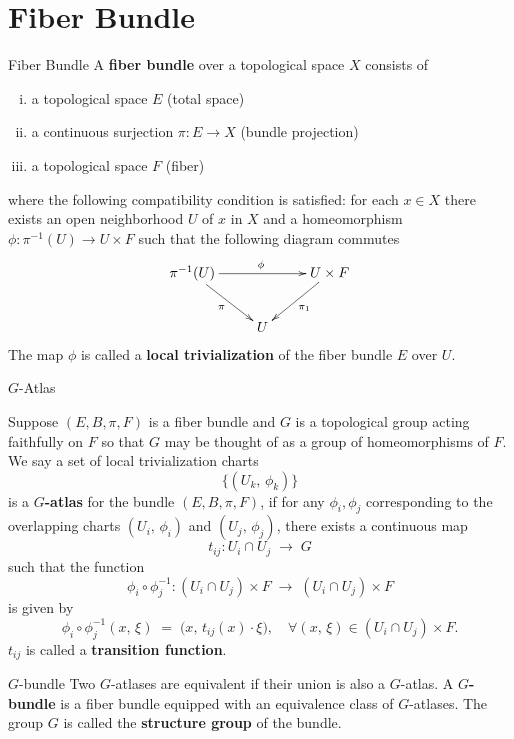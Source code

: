\documentclass{report}
\begin{document}
\section{Fiber Bundle}
\begin{definition}{Fiber Bundle}{}
	A \textbf{fiber bundle} over a topological space $X$ consists of
	\begin{enumerate}[(i)]
		\item a topological space $E$ (total space)
		\item a continuous surjection $\pi:E\to X$ (bundle projection)
		\item a topological space $F$ (fiber)
	\end{enumerate}
	where the following compatibility condition is satisfied: for each $x\in X$ there exists an open neighborhood $U$ of $x$ in $X$ and a homeomorphism $\phi:\pi^{-1}(U)\to U\times F$ such that
	the following diagram commutes
	\[\xymatrix{
			\pi^{-1}(U)\ar[rd]_{\pi}\ar[rr]^{\phi}  & &U\times F\ar[ld]^{\pi_1}\\
			&U&
		}\]
	The map $\phi$ is called a \textbf{local trivialization} of the fiber bundle $E$ over $U$.
\end{definition}

\begin{definition}{$G$-Atlas}{}

Suppose $(E, B, \pi, F)$ is a fiber bundle and $G$ is a topological group acting faithfully on $F$ so that $G$ may be thought of as a group of homeomorphisms of $F$. We say a set of local trivialization charts 
\[
\{(U_k,\, \phi_k)\}
\]
is a \textbf{$G$-atlas} for the bundle $(E, B, \pi, F)$, if for any $\phi_i, \phi_j$ corresponding to the overlapping charts $(U_i,\, \phi_i)$ and $(U_j,\, \phi_j)$, there exists a continuous map
\[
t_{ij} \colon U_i \cap U_j \;\to\; G
\]
such that
 the function
\[
\phi_i \circ\phi_j^{-1} \colon (U_i \cap U_j) \times F \;\to\; (U_i \cap U_j) \times F
\]
is given by
\[
\phi_i \circ \phi_j^{-1}(x,\, \xi) \;=\; \bigl(x,\, t_{ij}(x)\cdot\xi\bigr), \quad \forall (x,\, \xi) \in (U_i \cap U_j) \times F.
\]
$t_{ij}$ is called a \textbf{transition function}. 
\end{definition}

\begin{definition}{$G$-bundle}
	Two $G$-atlases are equivalent if their union is also a $G$-atlas. A \textbf{$G$-bundle} is a fiber bundle equipped with an equivalence class of $G$-atlases. The group $G$ is called the \textbf{structure group} of the bundle.
\end{definition}
\end{document}
